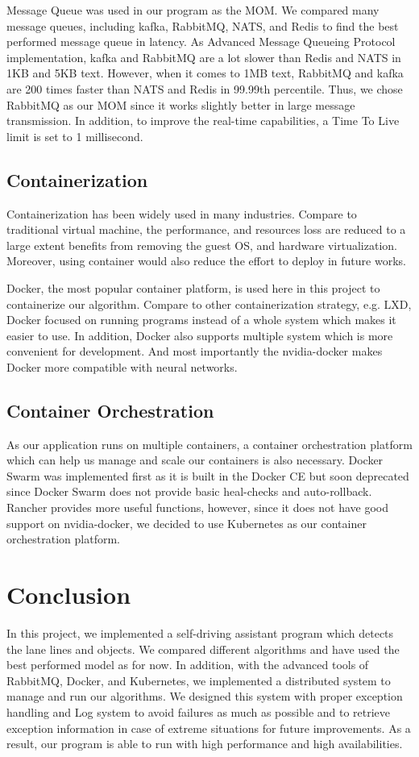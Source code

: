\documentclass[runningheads]{llncs}
\begin{document}
Message Queue was used in our program as the MOM. We 
compared many message queues, including kafka, RabbitMQ, 
NATS, and Redis to find the best performed message queue 
in latency. As Advanced Message Queueing Protocol 
implementation, kafka and RabbitMQ are a lot slower than 
Redis and NATS in 1KB and 5KB text. However, when it comes
to 1MB text, RabbitMQ and kafka are 200 times faster than 
NATS and Redis in 99.99th percentile. Thus, we chose 
RabbitMQ as our MOM since it works slightly better in large 
message transmission. In addition, to improve the real-time 
capabilities, a Time To Live limit is set to 1 millisecond.


\subsection{Containerization}
Containerization has been widely used in many industries. 
Compare to traditional virtual machine, the performance, 
and resources loss are reduced to a large extent benefits 
from removing the guest OS, and hardware virtualization. 
Moreover, using container would also reduce the effort to 
deploy in future works. 

Docker, the most popular container platform, is used here 
in this project to containerize our algorithm. Compare to 
other containerization strategy, e.g. LXD, Docker focused 
on running programs instead of a whole system which makes 
it easier to use. In addition, Docker also supports multiple 
system which is more convenient for development. And most 
importantly the nvidia-docker makes Docker more compatible 
with neural networks.

\subsection{Container Orchestration}
As our application runs on multiple containers, a container 
orchestration platform which can help us manage and scale 
our containers is also necessary. Docker Swarm was implemented 
first as it is built in the Docker CE but soon deprecated 
since Docker Swarm does not provide basic heal-checks 
and auto-rollback. Rancher provides more useful functions, 
however, since it does not have good support on 
nvidia-docker, we decided to use Kubernetes as our 
container orchestration platform.


\section{Conclusion}
In this project, we implemented a self-driving assistant 
program which detects the lane lines and objects. We 
compared different algorithms and have used the best performed 
model as for now. In addition, with the advanced tools of 
RabbitMQ, Docker, and Kubernetes, we implemented a 
distributed system to manage and run our algorithms. We 
designed this system with proper exception handling and Log 
system to avoid failures as much as possible and to 
retrieve exception information in case of extreme situations 
for future improvements. As a result, our program is able 
to run with high performance and high availabilities. 
\end{document}
